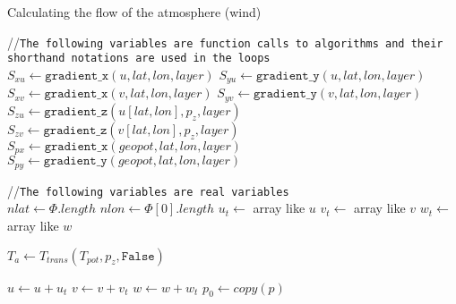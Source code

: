 \begin{algorithm}
    \caption{Calculating the flow of the atmosphere (wind)}
    \label{alg:velocity}
    //\texttt{The following variables are function calls to algorithms and their shorthand notations are used in the loops}\\
    $S_{xu} \leftarrow \texttt{gradient\_x}(u, lat, lon, layer)$ \;
    $S_{yu} \leftarrow \texttt{gradient\_y}(u, lat, lon, layer)$ \;
    $S_{xv} \leftarrow \texttt{gradient\_x}(v, lat, lon, layer)$ \;
    $S_{yv} \leftarrow \texttt{gradient\_y}(v, lat, lon, layer)$ \;
    $S_{zu} \leftarrow \texttt{gradient\_z}(u[lat, lon], p_z, layer)$ \;
    $S_{zv} \leftarrow \texttt{gradient\_z}(v[lat, lon], p_z, layer)$ \;
    $S_{px} \leftarrow \texttt{gradient\_x}(geopot, lat, lon, layer)$ \;
    $S_{py} \leftarrow \texttt{gradient\_y}(geopot, lat, lon, layer)$ \;

    //\texttt{The following variables are real variables}\\
    $nlat \leftarrow \Phi.length$ \;
    $nlon \leftarrow \Phi[0].length$ \;
    $u_t \leftarrow $ array like $u$ \;
    $v_t \leftarrow $ array like $v$ \;
    $w_t \leftarrow $ array like $w$ \;

    $T_a \leftarrow T_{trans}(T_{pot}, p_z, \texttt{False})$ \;


    $u \leftarrow u + u_t$ \;
    $v \leftarrow v + v_t$ \;
    $w \leftarrow w + w_t$ \;
    $p_0 \leftarrow copy(p)$ \;
\end{algorithm}